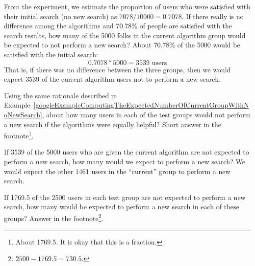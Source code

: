 \begin{example}{From the experiment, we estimate the proportion of users who were satisfied with their initial search (no new search) as $7078/10000 = 0.7078$. If there really is no difference among the algorithms and 70.78\% of people are satisfied with the search results, how many of the 5000 folks in the current algorithm group would be expected to not perform a new search?} \label{googleExampleComputingTheExpectedNumberOfCurrentGroupWithNoNewSearch}
About 70.78\% of the 5000 would be satisfied with the initial search:
$$ 0.7078*5000 = 3539\text{ users} $$
That is, if there was no difference between the three groups, then we would expect 3539 of the current algorithm users not to perform a new search.
\end{example}

\begin{exercise}\label{googleExampleComputingTheExpectedNumberOfNewAlgGroupWithNoNewSearch}
Using the same rationale described in Example~\ref{googleExampleComputingTheExpectedNumberOfCurrentGroupWithNoNewSearch}, about how many users in each of the test groups would not perform a new search if the algorithms were equally helpful? Short answer in the footnote\footnote{About 1769.5. It is okay that this is a fraction.}.
\end{exercise}

\begin{example}{If 3539 of the 5000 users who are given the current algorithm are not expected to perform a new search, how many would we expect to perform a new search?} \label{googleExampleComputingTheExpectedNumberOfCurrentGroupWithNewSearch}
We would expect the other 1461 users in the ``current'' group to perform a new search.
\end{example}

\begin{exercise}\label{googleExampleComputingTheExpectedNumberOfNewAlgGroupWithNewSearch}
If 1769.5 of the 2500 users in each test group are not expected to perform a new search, how many would be expected to perform a new search in each of these groups? Answer in the footnote\footnote{$2500 - 1769.5 = 730.5$.}.
\end{exercise}


